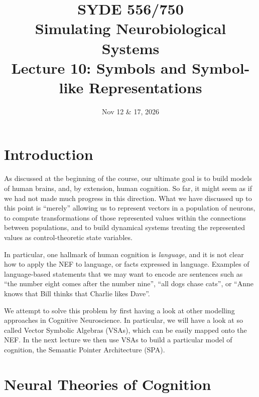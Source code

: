 \documentclass[10pt,letterpaper,oneside]{article}
\date{Nov 12 \& 17, 2026}
\title{SYDE 556/750 \\ Simulating Neurobiological Systems \\ Lecture 10: Symbols and Symbol-like Representations}
\begin{document}

\section{Introduction}


As discussed at the beginning of the course, our ultimate goal is to build models of human brains, and, by extension, human cognition. So far, it might seem as if we had not made much progress in this direction. What we have discussed up to this point is \enquote{merely} allowing us to represent vectors in a population of neurons, to compute transformations of those represented values within the connections between populations, and to build dynamical systems treating the represented values as control-theoretic state variables.

In particular, one hallmark of human cognition is \emph{language}, and it is not clear how to apply the NEF to language, or facts expressed in language. Examples of language-based statements that we may want to encode are sentences such as \enquote{the number eight comes after the number nine}, \enquote{all dogs chase cats}, or \enquote{Anne knows that Bill thinks that Charlie likes Dave}.

We attempt to solve this problem by first having a look at other modelling approaches in Cognitive Neuroscience. In particular, we will have a look at so called Vector Symbolic Algebras (VSAs), which can be easily mapped onto the NEF. In the next lecture we then use VSAs to build a particular model of cognition, the Semantic Pointer Architecture (SPA).

\section{Neural Theories of Cognition}

\end{document}
